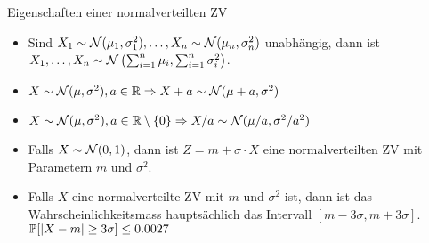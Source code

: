 Eigenschaften einer normalverteilten ZV
\begin{itemize}
\item Sind $X_1 \sim \mathcal{N} (\mu_1, \sigma_1^2) , \ldots , X_n \sim \mathcal{N} (\mu_n, \sigma_n^2)$ unabhängig, dann ist $X_{1},
	\ldots, X_{n} \sim \mathcal{N} \left( \sum_{i=1}^n \mu_i, \sum_{i=1}^{n} \sigma_i^2 \right)$.
	\item $X \sim \mathcal{N} (\mu, \sigma^2), a \in \mathbb{R} \Rightarrow X + a \sim \mathcal{N} (\mu + a , \sigma^2)$
	\item $X \sim \mathcal{N} (\mu, \sigma^2), a \in \mathbb{R}\setminus\{0\} \Rightarrow X/a \sim \mathcal{N} (\mu/a , \sigma^2/a^2)$
	\item Falls $X \sim \mathcal{N} (0,1)$, dann ist $Z = m + \sigma \cdot X$ eine normalverteilten ZV mit Parametern $m$ und
		$\sigma^2$.
	\item Falls $X$ eine normalverteilte ZV mit $m$ und $\sigma^2$ ist, dann ist das Wahrscheinlichkeitsmass
		hauptsächlich das Intervall $[m -3 \sigma, m + 3 \sigma]$.\\
		$\mathbb{P} [| X - m | \geq 3\sigma] \leq 0.0027$
\end{itemize}

